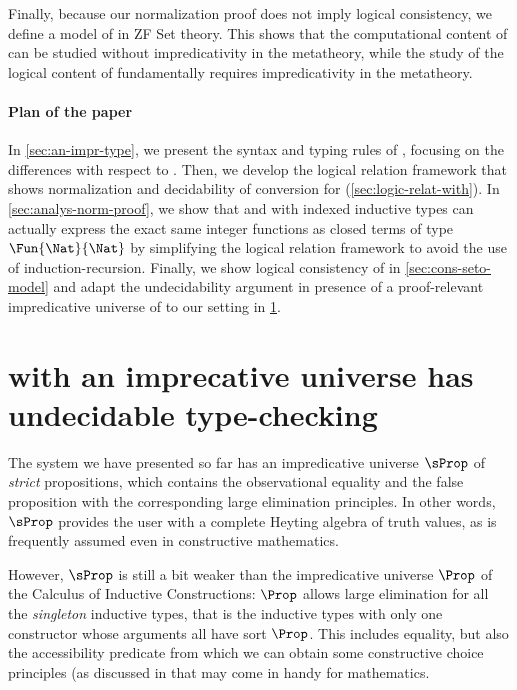 Finally, because our normalization proof does not imply logical
consistency, we define a model of \SetoidCC in ZF Set
theory.
%
This shows that the computational content of \SetoidCC can be studied
without impredicativity in the metatheory, while the study of the
logical content of \SetoidCC fundamentally requires impredicativity in
the metatheory.

\paragraph{Plan of the paper}

In \cref{sec:an-impr-type}, we present the syntax and typing rules of
\SetoidCC, focusing on the differences with respect to \SetoidTT.
%
Then, we develop the logical relation
framework that shows normalization and decidability of conversion for
\SetoidCC (\cref{sec:logic-relat-with}).
%
In \cref{sec:analys-norm-proof}, we show that \SetoidCC and \MLTT with
indexed inductive types can
actually express the exact same integer functions
  as closed terms of type \( \Fun{\Nat}{\Nat} \) by simplifying the
  logical relation framework to avoid the use of induction-recursion.
  Finally, we show logical consistency of \SetoidCC in
  \cref{sec:cons-seto-model} and adapt the undecidability argument in
  presence of a proof-relevant impredicative universe of
   to our setting in \cref{sec:setoidcc-with-an}.

  \section{\SetoidCC with an imprecative universe has undecidable type-checking}
  \label{sec:setoidcc-with-an}
  
  The system we have presented so far has an impredicative universe
  \( \sProp \) of \emph{strict} propositions, which contains the observational
  equality and the false proposition with the corresponding large
  elimination principles.
  In other words, \( \sProp \) provides the user with a complete Heyting
  algebra of truth values, as is frequently assumed even in constructive
  mathematics.
  
  However, \( \sProp \) is still a bit weaker than the impredicative
  universe \( \Prop \) of the Calculus of Inductive Constructions:
  \( \Prop \) allows large elimination for all the \emph{singleton}
  inductive types, that is the inductive types with only one constructor
  whose arguments all have sort \( \Prop \).
  This includes equality, but also the accessibility predicate from which
  we can obtain some constructive choice principles (as discussed in  that may
  come in handy for mathematics.
  
